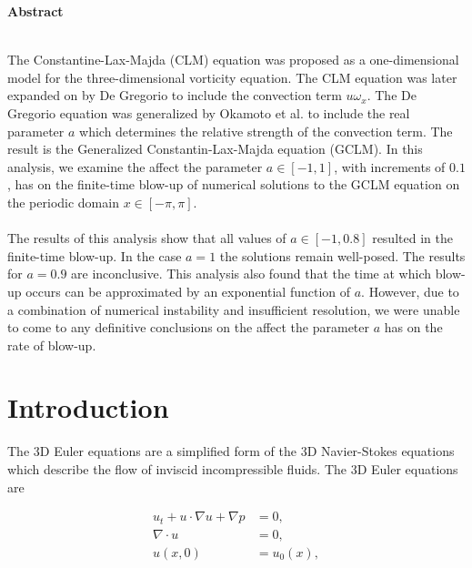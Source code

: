 \documentclass[12pt]{article}
\def\wx{\omega_x}
\def\ut{u_t}
\numberwithin{equation}{section}
\begin{document}
\begin{flushleft}
\begin{large}
\textbf{Abstract}
\\~\\
\end{large}
\end{flushleft}
\noindent
The Constantine-Lax-Majda (CLM) equation was proposed as a one-dimensional model for the three-dimensional vorticity equation. The CLM equation was later expanded on by De Gregorio to include the convection term $u\wx$. The De Gregorio equation was generalized by Okamoto et al. to include the real parameter $a$ which determines the relative strength of the convection term. The result is the Generalized Constantin-Lax-Majda equation (GCLM). In this analysis, we examine the affect the parameter $a\in[-1,1]$, with increments of $0.1$, has on the finite-time blow-up of numerical solutions to the GCLM equation on the periodic domain $x\in[-\pi,\pi]$. 
\\~\\
The results of this analysis show that all values of $a\in[-1,0.8]$  resulted in the finite-time blow-up. In the case $a=1$ the solutions remain well-posed. The results for $a=0.9$ are inconclusive. This analysis also found that the time at which blow-up occurs can be approximated by an exponential function of $a$. However, due to a combination of numerical instability and insufficient resolution, we were unable to come to any definitive conclusions on the affect the parameter $a$ has on the rate of blow-up. 

\pagebreak


{
  \hypersetup{linkcolor=black} %
  \tableofcontents
}

\pagebreak


\section{Introduction}

The 3D Euler equations are a simplified form of the 3D Navier-Stokes equations which describe the flow of inviscid incompressible fluids. The 3D Euler equations are

\vspace{-30pt}

\begin{subequations}\label{eq:3D:Euler}
\begin{align}
\ut + u\cdot \nabla u + \nabla p &= 0, \\
\nabla \cdot u &= 0, \\
u(x,0) &= u_0(x),
\end{align}
\end{subequations}
\end{document}
